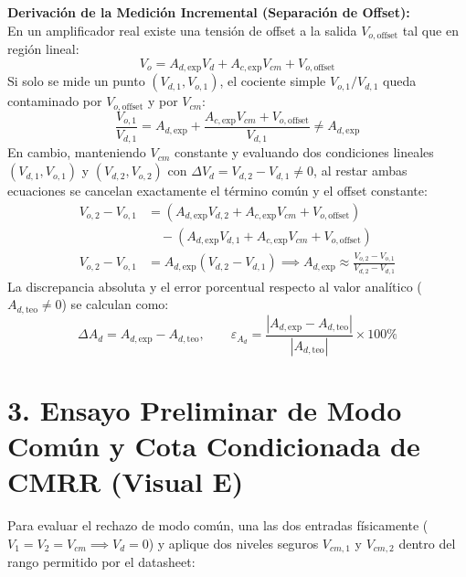 \documentclass[11pt, a4paper]{article}
\begin{document}
\textbf{Derivación de la Medición Incremental (Separación de Offset):} \\
En un amplificador real existe una tensión de offset a la salida $V_{o,\mathrm{offset}}$ tal que en región lineal:
\begin{equation}
    V_o = A_{d,\mathrm{exp}} V_d + A_{c,\mathrm{exp}} V_{cm} + V_{o,\mathrm{offset}}
\end{equation}
Si solo se mide un punto $(V_{d,1}, V_{o,1})$, el cociente simple $V_{o,1}/V_{d,1}$ queda contaminado por $V_{o,\mathrm{offset}}$ y por $V_{cm}$:
\begin{equation*}
    \frac{V_{o,1}}{V_{d,1}} = A_{d,\mathrm{exp}} + \frac{A_{c,\mathrm{exp}} V_{cm} + V_{o,\mathrm{offset}}}{V_{d,1}} \neq A_{d,\mathrm{exp}}
\end{equation*}
En cambio, manteniendo $V_{cm}$ constante y evaluando dos condiciones lineales $(V_{d,1}, V_{o,1})$ y $(V_{d,2}, V_{o,2})$ con $\Delta V_d = V_{d,2} - V_{d,1} \neq 0$, al restar ambas ecuaciones se cancelan exactamente el término común y el offset constante:
\begin{align}
    V_{o,2} - V_{o,1} &= \left(A_{d,\mathrm{exp}} V_{d,2} + A_{c,\mathrm{exp}} V_{cm} + V_{o,\mathrm{offset}}\right) \nonumber \\
                      &\quad - \left(A_{d,\mathrm{exp}} V_{d,1} + A_{c,\mathrm{exp}} V_{cm} + V_{o,\mathrm{offset}}\right) \nonumber \\
    V_{o,2} - V_{o,1} &= A_{d,\mathrm{exp}}(V_{d,2} - V_{d,1}) \implies \boxed{A_{d,\mathrm{exp}} \approx \frac{V_{o,2} - V_{o,1}}{V_{d,2} - V_{d,1}}}
\end{align}
La discrepancia absoluta y el error porcentual respecto al valor analítico ($A_{d,\mathrm{teo}} \neq 0$) se calculan como:
\begin{equation}
    \Delta A_d = A_{d,\mathrm{exp}} - A_{d,\mathrm{teo}}, \qquad \varepsilon_{A_d} = \frac{|A_{d,\mathrm{exp}} - A_{d,\mathrm{teo}}|}{|A_{d,\mathrm{teo}}|} \times 100\%
\end{equation}

\section*{3. Ensayo Preliminar de Modo Común y Cota Condicionada de CMRR (Visual E)}
Para evaluar el rechazo de modo común, una las dos entradas físicamente ($V_1 = V_2 = V_{cm} \implies V_d = 0$) y aplique dos niveles seguros $V_{cm,1}$ y $V_{cm,2}$ dentro del rango permitido por el datasheet:
\end{document}
